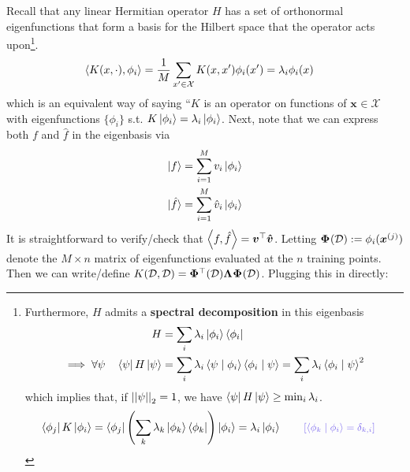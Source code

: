 \documentclass[11pt]{article}
\renewcommand\vec[2][]{\bm{#2}_{#1}}
\newcommand\mc{\mathcal}
\begin{document}
Recall that any linear Hermitian operator $H$ has a set of orthonormal eigenfunctions that form a basis for the Hilbert space that the operator acts upon\footnote{Furthermore, $H$ admits a \textbf{spectral decomposition} in this eigenbasis
\begin{align}
	H &= \sum_i \lambda_i \ket{\phi_i}\bra{\phi_i} \\
	\implies \forall \psi \quad 
	\bra{\psi} H \ket{\psi}
	&= \sum_i \lambda_i \braket{\psi \mid \phi_i}\braket{\phi_i \mid \psi} = \sum_i \lambda_i \braket{\phi_i \mid \psi}^2
\end{align}
which implies that, if $\left|\left| \psi \right|\right|_{2} = 1$, we have $\bra{\psi} H \ket{\psi} \geq \min_i \lambda_i$. 
\begin{align}
	\bra{\phi_j} K \ket{\phi_i}
	&= \bra{\phi_j} \lr{ \sum_{k} \lambda_k \ket{\phi_k}\bra{\phi_k} } \ket{\phi_i} 
	= \lambda_i \ket{\phi_i} \qquad \mblue{[\braket{\phi_k \mid \phi_i} = \delta_{k,i}]}
\end{align}
}. 
\begin{align}
	\innerprod{K(x, \cdot)}{\phi_i}
		&= \inv{M} \sum_{x' \in \mc X} K(x, x') \phi_i(x') 
		= \lambda_i \phi_i(x)
\end{align}
which is an equivalent way of saying ``$K$ is an operator on functions of $\vec x \in \mc X$ with eigenfunctions $\{\phi_i \}$ s.t. $K\ket{\phi_i} = \lambda_i \ket{\phi_i}$. Next, note that we can express both $f$ and $\hat f$ in the eigenbasis via 
\begin{align}
	\ket{f}
		&= \sum_{i = 1}^{M} v_i \ket{\phi_i} \\
	\ket{\hat f}
		&= \sum_{i = 1}^M \hat v_i \ket{\phi_i}
\end{align}
It is straightforward to verify/check that $\innerprod{f}{\hat f} = \vec{v}^\top \vec{\hat v}$. Letting $\matr\Phi(\mc D) := \phi_i(\ivec[j]{x})$ denote the $M \times n$ matrix of eigenfunctions evaluated at the $n$ training points. Then we can write/define $K(\mc D, \mc D) = \matr{\Phi}^\top(\mc D) \matr\Lambda \matr{\Phi}(\mc D)$. Plugging this in directly:
\end{document}
